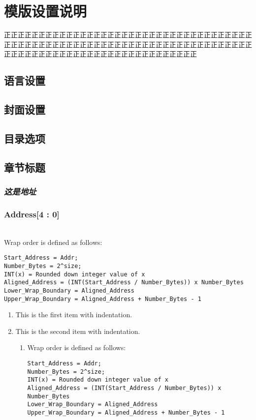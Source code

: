 
\chapter{模版设置说明}
正正正正正正正正正正正正正正正正正正正正正正正正正正正正正正正正正正正正正正正正正正正正正正正正正正正正正正正正正正正正正正正正正正正正正正正正正正正正正正正正正正正正正正正正正正正正正正正正正正正正

\section{语言设置}
    \lipsum[1]

\section{封面设置}
    \lipsum[1]

\section{目录选项}
    \lipsum[1]

\section{章节标题}
    \subsection*{\textit{\textbf{这是地址}}}
    \zhlipsum[1]

    \subsection*{\textbf{Address[4 : 0]}}
    \lipsum[1]\\
    Wrap order is defined as follows:
          \begin{lstlisting}
Start_Address = Addr;
Number_Bytes = 2^size;
INT(x) = Rounded down integer value of x
Aligned_Address = (INT(Start_Address / Number_Bytes)) x Number_Bytes 
Lower_Wrap_Boundary = Aligned_Address
Upper_Wrap_Boundary = Aligned_Address + Number_Bytes - 1
          \end{lstlisting}
    \lipsum[1]
    \begin{enumerate}
      \item This is the first item with indentation.
      \item This is the second item with indentation.
      \begin{enumerate}
          \item Wrap order is defined as follows:
          \begin{lstlisting}
Start_Address = Addr;
Number_Bytes = 2^size;
INT(x) = Rounded down integer value of x
Aligned_Address = (INT(Start_Address / Number_Bytes)) x Number_Bytes 
Lower_Wrap_Boundary = Aligned_Address
Upper_Wrap_Boundary = Aligned_Address + Number_Bytes - 1
          \end{lstlisting}
      \end{enumerate}
    \end{enumerate}

